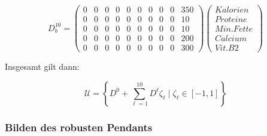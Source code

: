 \documentclass[a4paper,12pt]{article}
\begin{document}
\[
D^{10}_{b} = \begin{pmatrix}
0 & 0 & 0 & 0 & 0 & 0 & 0 & 0 & 0 & 350 \\ %
0 & 0 & 0 & 0 & 0 & 0 & 0 & 0 & 0 & 10 \\ %
0 & 0 & 0 & 0 & 0 & 0 & 0 & 0 & 0 & 10 \\ %
0 & 0 & 0 & 0 & 0 & 0 & 0 & 0 & 0 & 200 \\ %
0 & 0 & 0 & 0 & 0 & 0 & 0 & 0 & 0 & 300 %
\end{pmatrix}
\begin{pmatrix}
    Kalorien \\
    Proteine \\
    Min. Fette \\
    Calcium \\
    Vit. B2
\end{pmatrix}
\]

Insgesamt gilt dann:

\[
\mathcal{U} = \left\{ D^0 + \sum_{\ell=1}^{10}D^{\ell} \zeta_{\ell} \;\vert\; \zeta_{\ell} \in [-1, 1] \right\}
\]

\subsubsection*{Bilden des robusten Pendants}
\end{document}

